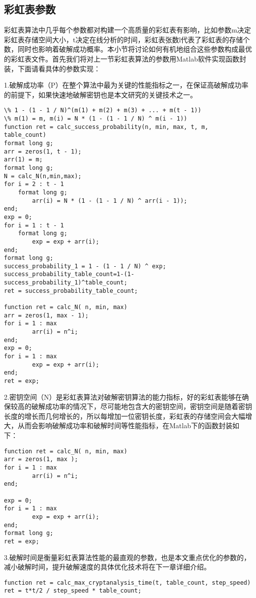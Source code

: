 \subsection{彩虹表参数}
彩虹表算法中几乎每个参数都对构建一个高质量的彩虹表有影响，比如参数m决定彩虹表存储空间大小，t决定在线分析的时间，彩虹表张数l代表了彩虹表的存储个数，同时也影响着破解成功概率。本小节将讨论如何有机地组合这些参数构成最优的彩虹表文件。首先我们将对上一节彩虹表算法的参数用Matlab软件实现函数封装，下面请看具体的参数实现：

1.破解成功率（P）\quad 在整个算法中最为关键的性能指标之一，在保证高破解成功率的前提下，如果快速地破解密钥也是本文研究的关键技术之一。
\begin{lstlisting}
\% 1 - (1 - 1 / N)^(m(1) + m(2) + m(3) + ... + m(t - 1))
\% m(1) = m, m(i) = N * (1 - (1 - 1 / N) ^ m(i - 1))
function ret = calc_success_probability(n, min, max, t, m, table_count)
format long g;
arr = zeros(1, t - 1);
arr(1) = m;
format long g;
N = calc_N(n,min,max);
for i = 2 : t - 1
    format long g;
        arr(i) = N * (1 - (1 - 1 / N) ^ arr(i - 1));
end;
exp = 0;
for i = 1 : t - 1
    format long g;
        exp = exp + arr(i);
end;
format long g;
success_probability_1 = 1 - (1 - 1 / N) ^ exp;
success_probability_table_count=1-(1-success_probability_1)^table_count;
ret = success_probability_table_count;

function ret = calc_N( n, min, max)
arr = zeros(1, max - 1);
for i = 1 : max
        arr(i) = n^i;
end;
exp = 0;
for i = 1 : max
        exp = exp + arr(i);
end;
ret = exp;
\end{lstlisting}

2.密钥空间（N）\quad 是彩虹表算法对破解密钥算法的能力指标，好的彩虹表能够在确保较高的破解成功率的情况下，尽可能地包含大的密钥空间，密钥空间是随着密钥长度的增长而几何增长的，所以每增加一位密钥长度，彩虹表的存储空间会大幅增大，从而会影响破解成功率和破解时间等性能指标，在Matlab下的函数封装如下：
\begin{lstlisting}
function ret = calc_N( n, min, max)
arr = zeros(1, max );
for i = 1 : max
        arr(i) = n^i;
end;

exp = 0;
for i = 1 : max
        exp = exp + arr(i);
end;
format long g;
ret = exp;
\end{lstlisting}

3.破解时间\quad 是衡量彩虹表算法性能的最直观的参数，也是本文重点优化的参数的，减小破解时间，提升破解速度的具体优化技术将在下一章详细介绍。
\begin{lstlisting}
function ret = calc_max_cryptanalysis_time(t, table_count, step_speed)
ret = t*t/2 / step_speed * table_count;
\end{lstlisting}

